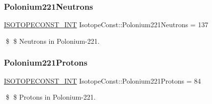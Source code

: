 \subsubsection{\texorpdfstring{Polonium221\+Neutrons}{Polonium221Neutrons}}
{\footnotesize\ttfamily \mbox{\hyperlink{group___isotope_const-_macros_ga5f18360b3e99483a35c32d789e62621c}{I\+S\+O\+T\+O\+P\+E\+C\+O\+N\+S\+T\+\_\+\+I\+NT}} Isotope\+Const\+::\+Polonium221\+Neutrons = 137}

\$ \$ Neutrons in Polonium-\/221. \mbox{\label{group___isotope_const-_polonium-_po221_gadc16489de263df754e9767a2c19387c1}} 
\subsubsection{\texorpdfstring{Polonium221\+Protons}{Polonium221Protons}}
{\footnotesize\ttfamily \mbox{\hyperlink{group___isotope_const-_macros_ga5f18360b3e99483a35c32d789e62621c}{I\+S\+O\+T\+O\+P\+E\+C\+O\+N\+S\+T\+\_\+\+I\+NT}} Isotope\+Const\+::\+Polonium221\+Protons = 84}

\$ \$ Protons in Polonium-\/221. 